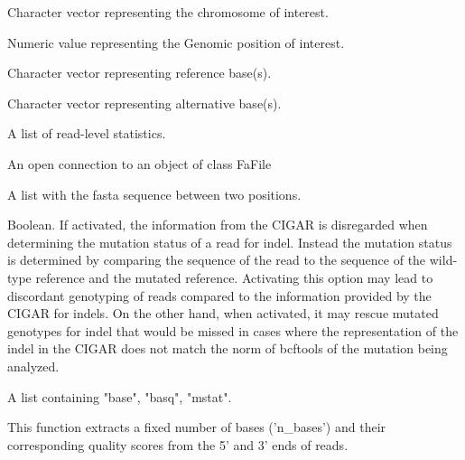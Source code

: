\documentclass[a4paper]{book}
\begin{document}
\begin{Arguments}
\begin{ldescription}
\item[\code{chr}] Character vector representing the chromosome of interest.

\item[\code{pos}] Numeric value representing the Genomic position of interest.

\item[\code{ref}] Character vector representing reference base(s).

\item[\code{alt}] Character vector representing alternative base(s).

\item[\code{read\_stats}] A list of read-level statistics.

\item[\code{fasta\_fafile}] An open connection to an object of class FaFile

\item[\code{fasta\_seq}] A list with the fasta sequence between two positions.

\item[\code{cigar\_free\_indel\_match}] Boolean. If activated, the information from the CIGAR is disregarded when determining the
mutation status of a read for indel. Instead the mutation status is determined by comparing the sequence of the read
to the sequence of the wild-type reference and the mutated reference. Activating this option may lead to discordant
genotyping of reads compared to the information provided by the CIGAR for indels. On the other hand, when
activated, it may rescue mutated genotypes for indel that would be missed in cases where the representation of the
indel in the CIGAR does not match the norm of bcftools of the mutation being analyzed.
\end{ldescription}
\end{Arguments}
%
\begin{Value}
A list containing "base", "basq", "mstat".
\end{Value}
%
\begin{Description}
This function extracts a fixed number of bases ('n\_bases')
and their corresponding quality scores from the 5' and 3' ends of reads.
\end{Description}
\end{document}
